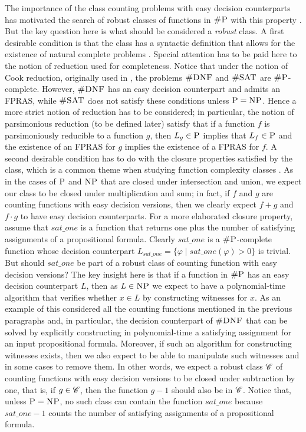 The importance of the class counting problems with easy decision counterparts has motivated the search of robust classes of functions in $\text{\sc \#P}$ with this property \cite{PagourtzisZ06}. But the key question here is what should be considered a {\em robust} class. A first desirable condition is that the class has a syntactic definition that allows for the existence of natural complete problems \cite{P94}. Special attention has to be paid here to the notion of reduction used for completeness. Notice that under the notion of Cook reduction, originally used in \cite{Valiant79}, the problems $\textsc{\#DNF}$ and $\textsc{\#SAT}$ are $\text{\sc \#P}$-complete. However, $\textsc{\#DNF}$ has an easy decision counterpart and admits an FPRAS, while $\textsc{\#SAT}$ does not satisfy these conditions unless $\text{\sc P} = \text{\sc NP}$. Hence a more strict notion of reduction has to be considered; in particular, the notion of parsimonious reduction (to be defined later) satisfy that if a function $f$ is parsimoniously reducible to a function $g$, then $L_g \in \text{\sc P}$ implies that $L_f \in \text{\sc P}$ and the existence of an FPRAS for $g$ implies the existence of a FPRAS for $f$. 
A second desirable condition has to do with the closure properties satisfied by the class, which is a common theme when studying function complexity classes \cite{OH93,FH08}. As in the cases of $\text{\sc P}$ and $\text{\sc NP}$ that are closed under intersection and union, we expect our class to be closed under multiplication and sum; in fact, if $f$ and $g$ are counting functions with easy decision versions, then we clearly expect $f + g$ and $f \cdot g$ to have easy decision counterparts. For a more elaborated closure property, assume that $\textit{sat\_one}$ is a function that returns one plus the number of satisfying assignments of a propositional formula. Clearly $\textit{sat\_one}$ is a $\text{\sc \#P}$-complete function whose decision counterpart $L_{\textit{sat\_one}} = \{ \varphi \mid \textit{sat\_one}(\varphi) > 0 \}$ is trivial. But should $\textit{sat\_one}$ be part of a robust class of counting function with easy decision versions? The key insight here is that if a function in $\text{\sc \#P}$ has an easy decision counterpart $L$, then as $L \in \text{\sc NP}$ we expect  to have a polynomial-time algorithm that verifies whether $x \in L$ by constructing witnesses for $x$. As an example of this considered all the counting functions mentioned in the previous paragraphs and, in particular, the decision counterpart of $\textsc{\#DNF}$ that can be solved by explicitly constructing in polynomial-time a satisfying assignment for an input propositional formula. Moreover, if such an algorithm for constructing witnesses exists, then we also expect to be able to manipulate such witnesses and in some cases to remove them. In other words, we expect a robust class $\mathscr{C}$ of counting functions with easy decision versions to be closed under subtraction by one, that is, if $g \in \mathscr{C}$, then the function $g - 1$ should also be in $\mathscr{C}$. Notice that, unless $\text{\sc P} = \text{\sc NP}$, no such class can contain the function $\textit{sat\_one}$ because $\textit{sat\_one} - 1$ counts the number of satisfying assignments of a propositional formula. 

